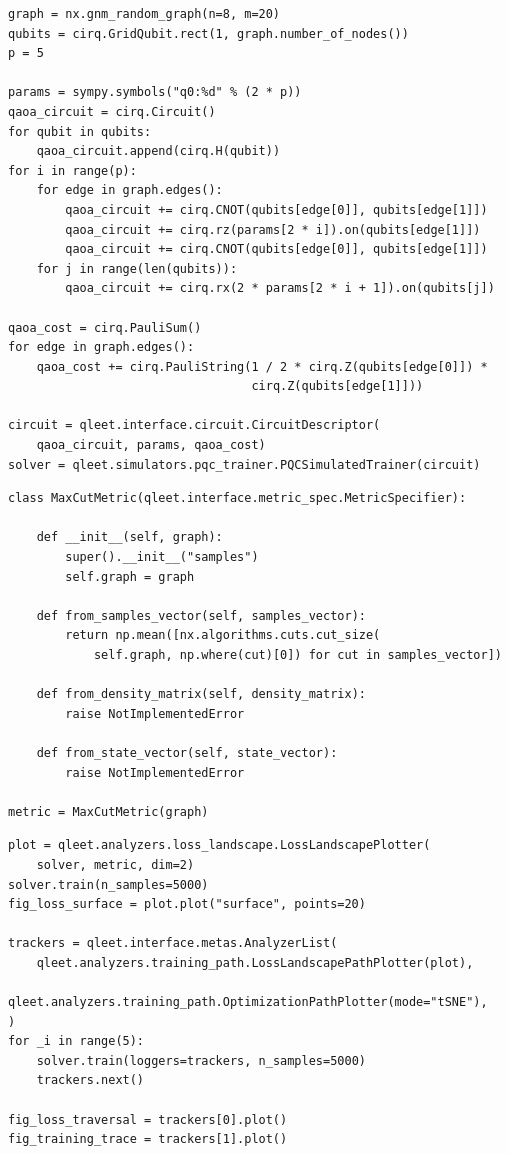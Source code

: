 \documentclass[%
 reprint,
 amsmath,
 amssymb,
 showkeys,
 pra,
 floatfix,
 onecolumn,
]{revtex4-2}
\begin{document}
\begin{lstlisting}
graph = nx.gnm_random_graph(n=8, m=20)
qubits = cirq.GridQubit.rect(1, graph.number_of_nodes())
p = 5

params = sympy.symbols("q0:%d" % (2 * p))
qaoa_circuit = cirq.Circuit()
for qubit in qubits:
    qaoa_circuit.append(cirq.H(qubit))
for i in range(p):
    for edge in graph.edges():
        qaoa_circuit += cirq.CNOT(qubits[edge[0]], qubits[edge[1]])
        qaoa_circuit += cirq.rz(params[2 * i]).on(qubits[edge[1]])
        qaoa_circuit += cirq.CNOT(qubits[edge[0]], qubits[edge[1]])
    for j in range(len(qubits)):
        qaoa_circuit += cirq.rx(2 * params[2 * i + 1]).on(qubits[j])

qaoa_cost = cirq.PauliSum()
for edge in graph.edges():
    qaoa_cost += cirq.PauliString(1 / 2 * cirq.Z(qubits[edge[0]]) * 
                                  cirq.Z(qubits[edge[1]]))

circuit = qleet.interface.circuit.CircuitDescriptor(
    qaoa_circuit, params, qaoa_cost)
solver = qleet.simulators.pqc_trainer.PQCSimulatedTrainer(circuit)
\end{lstlisting}

\begin{lstlisting}
class MaxCutMetric(qleet.interface.metric_spec.MetricSpecifier):

    def __init__(self, graph):
        super().__init__("samples")
        self.graph = graph

    def from_samples_vector(self, samples_vector):
        return np.mean([nx.algorithms.cuts.cut_size(
            self.graph, np.where(cut)[0]) for cut in samples_vector])
    
    def from_density_matrix(self, density_matrix):
        raise NotImplementedError
    
    def from_state_vector(self, state_vector):
        raise NotImplementedError

metric = MaxCutMetric(graph)
\end{lstlisting}

\begin{lstlisting}
plot = qleet.analyzers.loss_landscape.LossLandscapePlotter(
    solver, metric, dim=2)
solver.train(n_samples=5000)
fig_loss_surface = plot.plot("surface", points=20)

trackers = qleet.interface.metas.AnalyzerList(
    qleet.analyzers.training_path.LossLandscapePathPlotter(plot),
    qleet.analyzers.training_path.OptimizationPathPlotter(mode="tSNE"),
)
for _i in range(5):
    solver.train(loggers=trackers, n_samples=5000)
    trackers.next()
    
fig_loss_traversal = trackers[0].plot()
fig_training_trace = trackers[1].plot()
\end{lstlisting}
\end{document}
